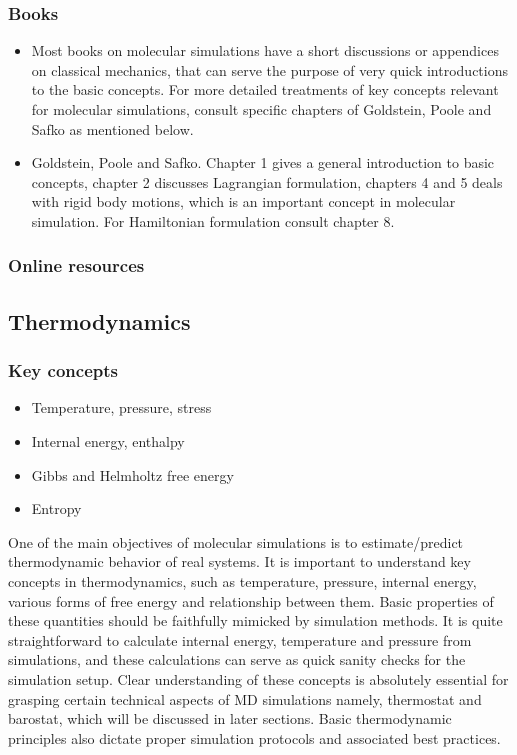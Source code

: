 \documentclass[9pt,bestpractices]{livecoms}
\begin{document}
\subsubsection{Books}
\begin{itemize}
\item Most books on molecular simulations have a short discussions or appendices on classical mechanics, that can serve the purpose of very quick introductions to the basic concepts. For more detailed treatments of key concepts relevant for molecular simulations, consult specific chapters of Goldstein, Poole and Safko as mentioned below.

\item Goldstein, Poole and Safko. Chapter 1 gives a general introduction to basic concepts, chapter 2 discusses Lagrangian formulation, chapters 4 and 5 deals with rigid body motions, which is an important concept in molecular simulation. For Hamiltonian formulation consult chapter 8.
\end{itemize}

\subsubsection{Online resources}


\subsection{Thermodynamics}
\subsubsection{Key concepts}
\begin{itemize}
\item Temperature, pressure, stress
\item Internal energy, enthalpy
\item Gibbs and Helmholtz free energy
\item Entropy
\end{itemize}

One of the main objectives of molecular simulations is to estimate/predict thermodynamic behavior of real systems. 
It is important to understand key concepts in thermodynamics, such as temperature, pressure, internal energy, various forms of free energy and relationship between them. 
Basic properties of these quantities should be faithfully mimicked by simulation methods. 
It is quite straightforward to calculate internal energy, temperature and pressure from simulations, and these calculations can serve as quick sanity checks for the simulation setup. 
Clear understanding of these concepts is absolutely essential for grasping certain technical aspects of MD simulations namely, thermostat and barostat, which will be discussed in later sections. 
Basic thermodynamic principles also dictate proper simulation protocols and associated best practices.
\end{document}
